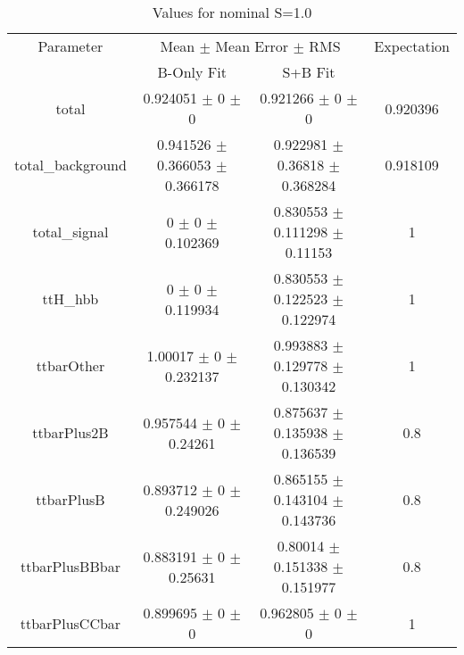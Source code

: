 \begin{table}
\centering
\caption{Values for nominal S=1.0}
\begin{tabular}{cccc}
\toprule
Parameter & \multicolumn{2}{c}{Mean $\pm$ Mean Error $\pm$ RMS} & Expectation\\
 & B-Only Fit & S+B Fit & \\
\midrule
total & \num{0.924051} $\pm$ \num{0} $\pm$ \num{0} & \num{0.921266} $\pm$ \num{0} $\pm$ \num{0} & \num{0.920396}\\
total\_background & \num{0.941526} $\pm$ \num{0.366053} $\pm$ \num{0.366178} & \num{0.922981} $\pm$ \num{0.36818} $\pm$ \num{0.368284} & \num{0.918109}\\
total\_signal & \num{0} $\pm$ \num{0} $\pm$ \num{0.102369} & \num{0.830553} $\pm$ \num{0.111298} $\pm$ \num{0.11153} & \num{1}\\
ttH\_hbb & \num{0} $\pm$ \num{0} $\pm$ \num{0.119934} & \num{0.830553} $\pm$ \num{0.122523} $\pm$ \num{0.122974} & \num{1}\\
ttbarOther & \num{1.00017} $\pm$ \num{0} $\pm$ \num{0.232137} & \num{0.993883} $\pm$ \num{0.129778} $\pm$ \num{0.130342} & \num{1}\\
ttbarPlus2B & \num{0.957544} $\pm$ \num{0} $\pm$ \num{0.24261} & \num{0.875637} $\pm$ \num{0.135938} $\pm$ \num{0.136539} & \num{0.8}\\
ttbarPlusB & \num{0.893712} $\pm$ \num{0} $\pm$ \num{0.249026} & \num{0.865155} $\pm$ \num{0.143104} $\pm$ \num{0.143736} & \num{0.8}\\
ttbarPlusBBbar & \num{0.883191} $\pm$ \num{0} $\pm$ \num{0.25631} & \num{0.80014} $\pm$ \num{0.151338} $\pm$ \num{0.151977} & \num{0.8}\\
ttbarPlusCCbar & \num{0.899695} $\pm$ \num{0} $\pm$ \num{0} & \num{0.962805} $\pm$ \num{0} $\pm$ \num{0} & \num{1}\\
\bottomrule
\end{tabular}
\end{table}